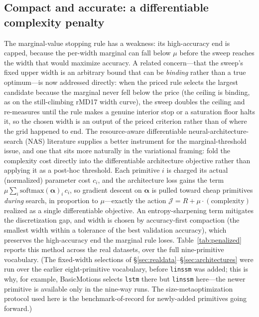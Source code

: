 \documentclass[11pt]{article}
\newcommand{\allowbreakhere}{\discretionary{}{}{}}
\newcommand{\code}[1]{\texttt{\def\_{\char`_\allowbreakhere}#1}}
\newcommand{\alphapar}{\bm{\alpha}}
\begin{document}
\subsection{Compact and accurate: a differentiable complexity penalty}
\label{sec:penalized}

The marginal-value stopping rule has a weakness: its high-accuracy end is capped, because the
per-width marginal can fall below $\mu$ before the sweep reaches the width that would maximize
accuracy. A related concern---that the sweep's fixed upper width is an arbitrary bound that can be
\emph{binding} rather than a true optimum---is now addressed directly: when the priced rule selects the
largest candidate because the marginal never fell below the price (the ceiling is binding, as on the
still-climbing rMD17 width curve), the sweep doubles the ceiling and re-measures until the rule makes a
genuine interior stop or a saturation floor halts it, so the chosen width is an output of the priced
criterion rather than of where the grid happened to end. The resource-aware differentiable neural-architecture-search (NAS) literature
supplies a better instrument for the marginal-threshold issue, and one that sits more naturally in the
variational framing: fold the complexity cost directly into the
differentiable architecture objective rather than applying it as a post-hoc threshold. Each
primitive $i$ is charged its actual (normalized) parameter cost $c_i$, and the architecture loss
gains the term $\mu\sum_i \mathrm{softmax}(\alphapar)_i\,c_i$, so gradient descent on $\alphapar$
is pulled toward cheap primitives \emph{during} search, in proportion to $\mu$---exactly the
action $\mathcal{J}=R+\mu\cdot(\text{complexity})$ realized as a single differentiable objective.
An entropy-sharpening term mitigates the discretization gap, and width is chosen by
accuracy-first compaction (the smallest width within a tolerance of the best validation accuracy),
which preserves the high-accuracy end the marginal rule loses. Table~\ref{tab:penalized} reports
this method across the real datasets, over the full nine-primitive vocabulary. (The fixed-width
selections of \S\ref{sec:realdata}--\S\ref{sec:architectures} were run over the earlier
eight-primitive vocabulary, before \code{linssm} was added; this is why, for example,
BasicMotions selects \code{lstm} there but \code{linssm} here---the newer primitive is available
only in the nine-way runs. The size-metaoptimization protocol used here is the benchmark-of-record
for newly-added primitives going forward.)
\end{document}
